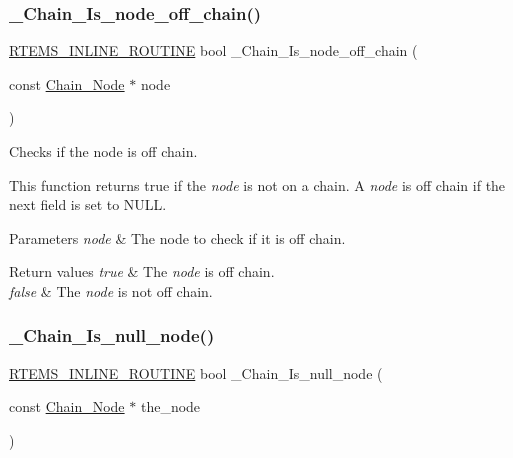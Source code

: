 \subsubsection{\texorpdfstring{\_Chain\_Is\_node\_off\_chain()}{\_Chain\_Is\_node\_off\_chain()}}
{\footnotesize\ttfamily \mbox{\hyperlink{group__RTEMSScoreBaseDefs_gac216239df231d5dbd15e3520b0b9313f}{R\+T\+E\+M\+S\+\_\+\+I\+N\+L\+I\+N\+E\+\_\+\+R\+O\+U\+T\+I\+NE}} bool \+\_\+\+Chain\+\_\+\+Is\+\_\+node\+\_\+off\+\_\+chain (\begin{DoxyParamCaption}\item[{const \mbox{\hyperlink{group__RTEMSScoreChain_ga0dd4bfcca1ac7f90de2842e447846d3d}{Chain\+\_\+\+Node}} $\ast$}]{node }\end{DoxyParamCaption})}



Checks if the node is off chain. 

This function returns true if the {\itshape node} is not on a chain. A {\itshape node} is off chain if the next field is set to N\+U\+LL.


\begin{DoxyParams}{Parameters}
{\em node} & The node to check if it is off chain.\\
\hline
\end{DoxyParams}

\begin{DoxyRetVals}{Return values}
{\em true} & The {\itshape node} is off chain. \\
\hline
{\em false} & The {\itshape node} is not off chain. \\
\hline
\end{DoxyRetVals}
\mbox{\label{group__RTEMSScoreChain_gaa0e3746a0f08242d67fe3f2198f2c6d6}} 
\subsubsection{\texorpdfstring{\_Chain\_Is\_null\_node()}{\_Chain\_Is\_null\_node()}}
{\footnotesize\ttfamily \mbox{\hyperlink{group__RTEMSScoreBaseDefs_gac216239df231d5dbd15e3520b0b9313f}{R\+T\+E\+M\+S\+\_\+\+I\+N\+L\+I\+N\+E\+\_\+\+R\+O\+U\+T\+I\+NE}} bool \+\_\+\+Chain\+\_\+\+Is\+\_\+null\+\_\+node (\begin{DoxyParamCaption}\item[{const \mbox{\hyperlink{group__RTEMSScoreChain_ga0dd4bfcca1ac7f90de2842e447846d3d}{Chain\+\_\+\+Node}} $\ast$}]{the\+\_\+node }\end{DoxyParamCaption})}



